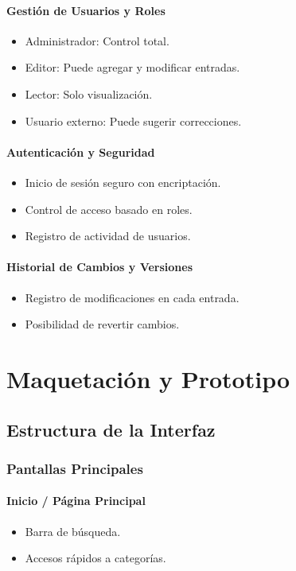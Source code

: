 \documentclass{article}
\begin{document}
\paragraph{Gestión de Usuarios y Roles}
\begin{itemize}
    \item Administrador: Control total.
    \item Editor: Puede agregar y modificar entradas.
    \item Lector: Solo visualización.
    \item Usuario externo: Puede sugerir correcciones.
\end{itemize}

\paragraph{Autenticación y Seguridad}
\begin{itemize}
    \item Inicio de sesión seguro con encriptación.
    \item Control de acceso basado en roles.
    \item Registro de actividad de usuarios.
\end{itemize}

\paragraph{Historial de Cambios y Versiones}
\begin{itemize}
    \item Registro de modificaciones en cada entrada.
    \item Posibilidad de revertir cambios.
\end{itemize}

\section{Maquetación y Prototipo}

\subsection{Estructura de la Interfaz}

\subsubsection{Pantallas Principales}

\paragraph{Inicio / Página Principal}
\begin{itemize}
    \item Barra de búsqueda.
    \item Accesos rápidos a categorías.
\end{itemize}
\end{document}
